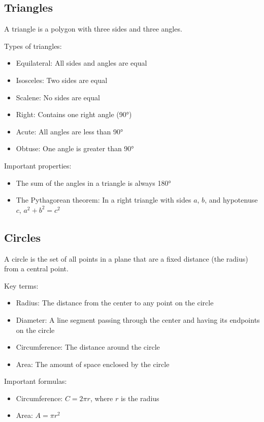 \documentclass[12pt,a4paper]{article}
\begin{document}
\subsection{Triangles}

A triangle is a polygon with three sides and three angles.

Types of triangles:
\begin{itemize}
    \item Equilateral: All sides and angles are equal
    \item Isosceles: Two sides are equal
    \item Scalene: No sides are equal
    \item Right: Contains one right angle (90°)
    \item Acute: All angles are less than 90°
    \item Obtuse: One angle is greater than 90°
\end{itemize}

Important properties:
\begin{itemize}
    \item The sum of the angles in a triangle is always 180°
    \item The Pythagorean theorem: In a right triangle with sides $a$, $b$, and hypotenuse $c$, $a^2 + b^2 = c^2$
\end{itemize}

\subsection{Circles}

A circle is the set of all points in a plane that are a fixed distance (the radius) from a central point.

Key terms:
\begin{itemize}
    \item Radius: The distance from the center to any point on the circle
    \item Diameter: A line segment passing through the center and having its endpoints on the circle
    \item Circumference: The distance around the circle
    \item Area: The amount of space enclosed by the circle
\end{itemize}

Important formulas:
\begin{itemize}
    \item Circumference: $C = 2\pi r$, where $r$ is the radius
    \item Area: $A = \pi r^2$
\end{itemize}
\end{document}
